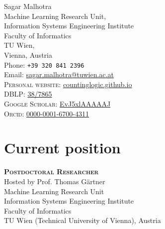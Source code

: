 \documentclass[10pt, a4paper]{article}
\newcommand{\years}[1]{\marginnote{\scriptsize #1}}
\begin{document}
{\LARGE Sagar Malhotra }\\[0.2cm]
Machine Learning Research Unit,\\
Information Systems Engineering Institute\\
Faculty of Informatics\\
TU Wien,\\
Vienna, Austria \\

Phone: \texttt{+39 320 841 2396}\\
Email: \href{mailto:sagar.malhotra@tuwien.ac.at}{sagar.malhotra@tuwien.ac.at}\\
\textsc{Personal website}: \href{https://countinglogic.github.io}{countinglogic.github.io}\\
\textsc{DBLP}: \href{https://dblp.org/pid/38/7865.html}{38/7865}\\
\textsc{Google Scholar}: \href{https://scholar.google.com/citations?user=EvJ5xlAAAAAJ&hl=en}{EvJ5xlAAAAAJ}\\
\textsc{Orcid}: \href{https://orcid.org/0000-0001-6700-4311}{0000-0001-6700-4311}


\section*{Current position}
\noindent
\years{05.2023-now}\textsc{\textbf{Postdoctoral Researcher}}\\
Hosted by Prof. Thomas G\"{a}rtner\\
Machine Learning Research Unit\\
Information Systems Engineering Institute\\
Faculty of Informatics\\
TU Wien (Technical University of Vienna), Austria\\
\end{document}
